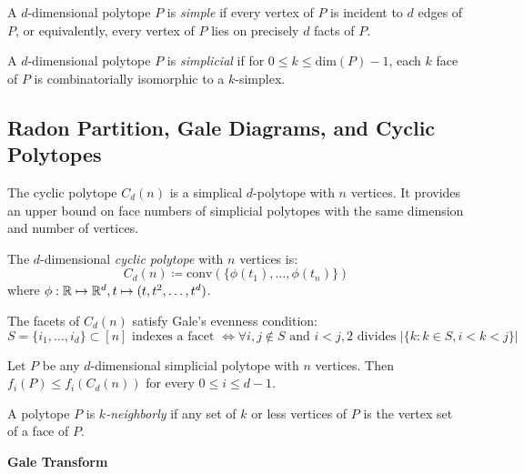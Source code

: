 \begin{definition}
    A $d$-dimensional polytope $P$ is \textit{simple} if every vertex of $P$ is incident to $d$ edges of $P$, or equivalently, every vertex of $P$ lies on precisely $d$ facts of $P$.

    A $d$-dimensional polytope $P$ is \textit{simplicial} if for $0 \leq k \leq \text{dim}(P) - 1$, each $k$ face of $P$ is combinatorially isomorphic to a $k$-simplex.
\end{definition}

\subsection{Radon Partition, Gale Diagrams, and Cyclic Polytopes}

The cyclic polytope $C_d(n)$ is a simplical $d$-polytope with $n$ vertices.
It provides an upper bound on face numbers of simplicial polytopes with the same dimension and number of vertices.
\begin{definition}
    The $d$-dimensional \textit{cyclic polytope} with $n$ vertices is:
    $$C_d(n) \coloneqq \text{conv}(\{\phi(t_1), \dots,  \phi(t_n)\})$$
    where $\phi : \mathbb{R} \mapsto \mathbb{R}^d, t \mapsto (t, t^2, \dots, t^d)$.
\end{definition}

\begin{obs}
    The facets of $C_d(n)$ satisfy Gale's evenness condition:
    $$ S = \lbrace i_1, \dots, i_d \rbrace \subset [n] \text{ indexes a facet } \Leftrightarrow \forall i,j \not\in S \text{ and } i < j, 2 \text{ divides } |\{k : k \in S, i < k < j\}|$$
\end{obs}

\begin{theorem}
    Let $P$ be any $d$-dimensional simplicial polytope with $n$ vertices. Then $f_i(P) \leq f_i(C_d(n))$ for every $0 \leq i \leq d-1$.
\end{theorem}

\begin{definition}[k-neighbourness]
    A polytope $P$ is \textit{$k$-neighborly} if any set of $k$ or less vertices of $P$ is the vertex set of a face of $P$.
\end{definition}

\textbf{Gale Transform}

